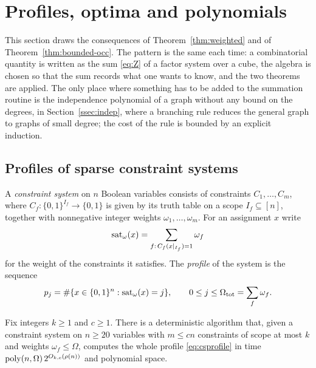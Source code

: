 \section{Profiles, optima and polynomials}\label{sec:applications}

This section draws the consequences of Theorem~\ref{thm:weighted} and of
Theorem~\ref{thm:bounded-occ}. The pattern is the same each time: a
combinatorial quantity is written as the sum \eqref{eq:Z} of a factor system
over a cube, the algebra is chosen so that the sum records what one wants to
know, and the two theorems are applied. The only place where something has to
be added to the summation routine is the independence polynomial of a graph
without any bound on the degrees, in Section~\ref{ssec:indep}, where a
branching rule reduces the general graph to graphs of small degree; the cost of
the rule is bounded by an explicit induction.

\subsection{Profiles of sparse constraint systems}\label{ssec:profile}
A \emph{constraint system} on $n$ Boolean variables consists of constraints
$C_1,\dots,C_m$, where $C_f:\{0,1\}^{I_f}\to\{0,1\}$ is given by its truth
table on a scope $I_f\subseteq[n]$, together with nonnegative integer weights
$\omega_1,\dots,\omega_m$. For an assignment $x$ write
\[
  \operatorname{sat}_\omega(x)=\sum_{f:\,C_f(x|_{I_f})=1}\omega_f
\]
for the weight of the constraints it satisfies. The \emph{profile} of the
system is the sequence
\begin{equation}\label{eq:csprofile}
  p_j=\#\{x\in\{0,1\}^n:\operatorname{sat}_\omega(x)=j\},\qquad 0\le j\le\Omega_{\mathrm{tot}}=\sum_f\omega_f .
\end{equation}

\begin{theorem}[Profiles]\label{thm:profile}
Fix integers $k\ge1$ and $c\ge1$. There is a deterministic algorithm that, given
a constraint system on $n\ge20$ variables with $m\le cn$ constraints of scope at
most $k$ and weights $\omega_f\le\Omega$, computes the whole profile
\eqref{eq:csprofile} in time $\operatorname{poly}(n,\Omega)\,2^{O_{k,c}(\rho(n))}$ and
polynomial space.
\end{theorem}

